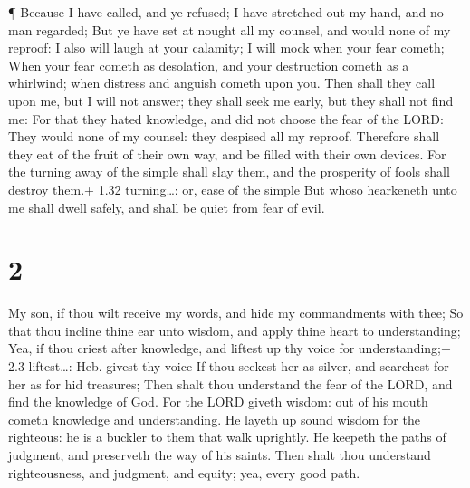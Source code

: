  ¶ Because I have called, and ye refused; I have stretched
out my hand, and no man regarded;  But ye have set at
nought all my counsel, and would none of my reproof:  I
also will laugh at your calamity; I will mock when your fear cometh;
 When your fear cometh as desolation, and your destruction
cometh as a whirlwind; when distress and anguish cometh upon you.
 Then shall they call upon me, but I will not answer; they
shall seek me early, but they shall not find me:  For that
they hated knowledge, and did not choose the fear of the LORD:
 They would none of my counsel: they despised all my
reproof.  Therefore shall they eat of the fruit of their
own way, and be filled with their own devices.  For the
turning away of the simple shall slay them, and the prosperity of fools
shall destroy them.+ 1.32 turning\ldots: or, ease of the simple
 But whoso hearkeneth unto me shall dwell safely, and shall
be quiet from fear of evil.

\hypertarget{section-1}{%
\section{2}\label{section-1}}

 My son, if thou wilt receive my words, and hide my
commandments with thee;  So that thou incline thine ear unto
wisdom, and apply thine heart to understanding;  Yea, if
thou criest after knowledge, and liftest up thy voice for
understanding;+ 2.3 liftest\ldots: Heb. givest thy voice  If
thou seekest her as silver, and searchest for her as for hid treasures;
 Then shalt thou understand the fear of the LORD, and find
the knowledge of God.  For the LORD giveth wisdom: out of
his mouth cometh knowledge and understanding.  He layeth up
sound wisdom for the righteous: he is a buckler to them that walk
uprightly.  He keepeth the paths of judgment, and preserveth
the way of his saints.  Then shalt thou understand
righteousness, and judgment, and equity; yea, every good path.

